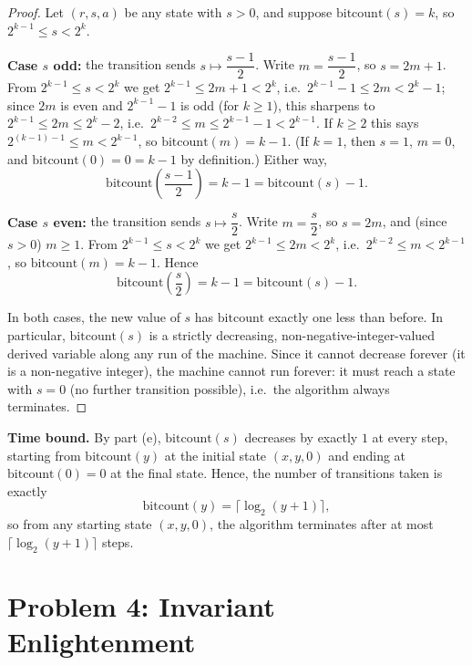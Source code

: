 \documentclass[11pt]{article}
\newcommand{\partlabel}[1]{%
    \noindent\makebox[2em][l]{\textbf{(#1)}}%
}
\begin{document}
\begin{proof}
Let $(r,s,a)$ be any state with $s > 0$, and suppose $\mathrm{bitcount}(s) = k$, so $2^{k-1} \le s < 2^k$.

\textbf{Case $s$ odd:} the transition sends $s \mapsto \dfrac{s-1}{2}$. Write $m = \dfrac{s-1}{2}$, so $s = 2m+1$.
From $2^{k-1} \le s < 2^k$ we get $2^{k-1} \le 2m+1 < 2^k$, i.e.\ $2^{k-1}-1 \le 2m < 2^k - 1$; since $2m$ is even and $2^{k-1}-1$ is odd (for $k \ge 1$), this sharpens to $2^{k-1} \le 2m \le 2^k - 2$, i.e.\ $2^{k-2} \le m \le 2^{k-1}-1 < 2^{k-1}$. If $k \ge 2$ this says $2^{(k-1)-1} \le m < 2^{k-1}$, so $\mathrm{bitcount}(m) = k-1$. (If $k=1$, then $s=1$, $m=0$, and $\mathrm{bitcount}(0)=0=k-1$ by definition.) Either way,
\[
\mathrm{bitcount}\!\left(\frac{s-1}{2}\right) = k - 1 = \mathrm{bitcount}(s) - 1.
\]

\textbf{Case $s$ even:} the transition sends $s \mapsto \dfrac{s}{2}$. Write $m = \dfrac{s}{2}$, so $s = 2m$, and (since $s>0$) $m \ge 1$.
From $2^{k-1} \le s < 2^k$ we get $2^{k-1} \le 2m < 2^k$, i.e.\ $2^{k-2} \le m < 2^{k-1}$, so $\mathrm{bitcount}(m) = k-1$. Hence
\[
\mathrm{bitcount}\!\left(\frac{s}{2}\right) = k-1 = \mathrm{bitcount}(s) - 1.
\]

In both cases, the new value of $s$ has $\mathrm{bitcount}$ exactly one less than before. In particular, $\mathrm{bitcount}(s)$ is a strictly decreasing, non-negative-integer-valued derived variable along any run of the machine. Since it cannot decrease forever (it is a non-negative integer), the machine cannot run forever: it must reach a state with $s = 0$ (no further transition possible), i.e.\ the algorithm always terminates.
\end{proof}

\medskip
\partlabel{f}
\textbf{Time bound.} By part (e), $\mathrm{bitcount}(s)$ decreases by exactly $1$ at every step, starting from $\mathrm{bitcount}(y)$ at the initial state $(x,y,0)$ and ending at $\mathrm{bitcount}(0) = 0$ at the final state. Hence, the number of transitions taken is exactly
\[
\mathrm{bitcount}(y) = \lceil \log_2(y+1) \rceil,
\]
so from any starting state $(x,y,0)$, the algorithm terminates after at most $\lceil \log_2(y+1)\rceil$ steps.

\newpage
\section*{Problem 4: Invariant Enlightenment}
\end{document}
